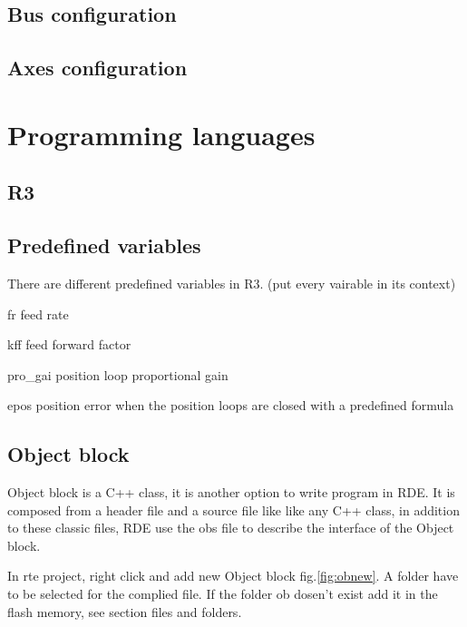 %	
\subsection{Bus configuration}

%	
\subsection{Axes configuration}

\section{Programming languages}

%	
\subsection{R3}

%	
\subsection{Predefined variables}
There are different predefined variables in R3. (put every vairable in its context)

fr feed rate

kff feed forward factor

pro\_gai  position loop proportional gain

epos position error when the position loops are closed with a predefined formula


%	
\subsection{Object block}
Object block is a C++ class, it is another option to write program in RDE. It is composed from a header file and a source file like like any C++ class, in addition to these classic files, RDE use the obs file to describe the interface of the Object block.

In rte project, right click and add new Object block fig.\ref{fig:obnew}. A folder have to be selected for the complied file. If the folder ob dosen't exist add it in the flash memory, see section files and folders.

